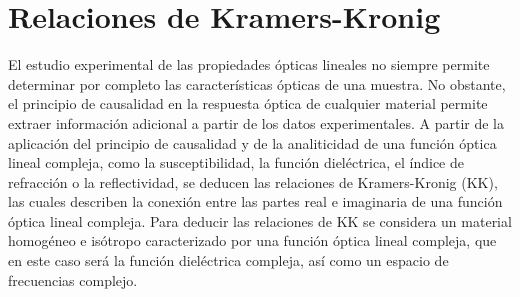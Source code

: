 

\section{Relaciones de Kramers-Kronig}
\label{section:yth}

El estudio experimental de las propiedades ópticas lineales no siempre permite determinar por completo las características ópticas de una muestra. No obstante, el principio de causalidad en la respuesta óptica de cualquier material permite extraer información adicional a partir de los datos experimentales.  A partir de la aplicación del principio de causalidad y de la analiticidad de una función óptica lineal compleja, como la susceptibilidad, la función dieléctrica, el índice de refracción o la reflectividad, se deducen las relaciones de Kramers-Kronig (KK), las cuales describen la conexión entre las partes real e imaginaria de una función óptica lineal compleja. Para deducir las relaciones de KK se considera un material homogéneo e isótropo caracterizado por una función óptica lineal compleja, que en este caso será la función dieléctrica compleja, así como un espacio de frecuencias complejo.

